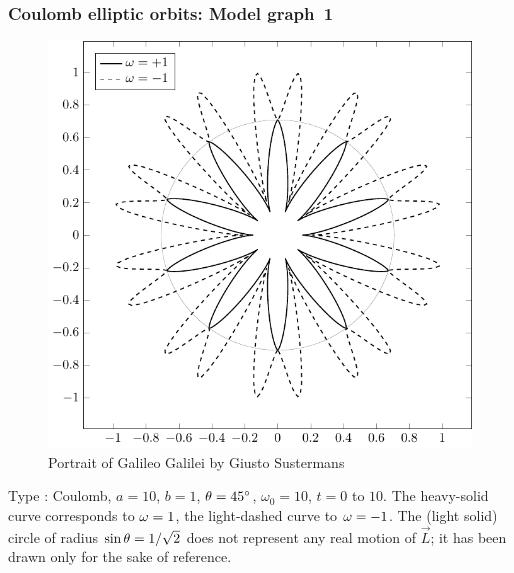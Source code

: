 \subsubsection*{Coulomb elliptic orbits: Model graph~1} 
\begin{figure}[H]
\centering
\includegraphics[scale=.4]{src/images/lbk-graphics/larm-c-10-1-45-1-10.pdf}
\caption*{Portrait of Galileo Galilei by Giusto Sustermans}\label{fig2.9}
\end{figure}

Type : Coulomb, $a= 10$, $b =1$, ${\theta} = \ang{45}$, 
$\omega_0 = 10$, $t =0$ to $10$. The heavy-solid 
curve corresponds to ${\omega} = 1$, the light-dashed curve to 
${\omega} = -1$. The (light solid) circle of radius $\sin {\theta} 
= 1/\sqrt{2}$ does not represent any real motion of 
$\vec{L}$; it has been drawn only for the sake of reference.


\vspace{-.3cm}

